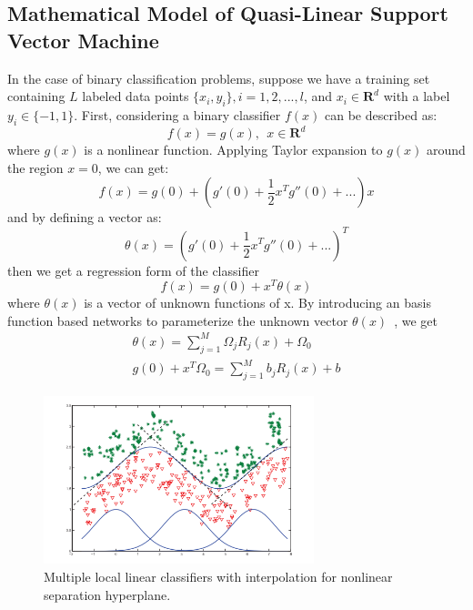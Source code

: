 \documentclass[master]{IPSstyle}
\begin{document}
{\subsection{Mathematical Model of Quasi-Linear Support Vector Machine}
In the case of binary classification problems, suppose we have a training set containing $L$ labeled data points $\{x_i, y_i\}, i=1,2,...,l$, and $x_i\in\mathbf{R}^d$ with a label $y_i \in \{-1,1\}$. First, considering a binary classifier $f(x)$ can be described as:
\begin{equation}
f(x) = g(x), ~~ x\in \mathbf{R}^d \label{eq:2.18}
\end{equation}
where $g(x)$ is a nonlinear function. Applying Taylor expansion to $g(x)$ around the region $x=0$, we can get:
\begin{equation}
f(x) = g(0) + \left(g'(0) + \frac{1}{2}x^Tg''(0)+...\right)x \label{eq:2.19}
\end{equation}
and by defining a vector as:
\begin{equation}
\theta(x) = \left(g'(0) + \frac{1}{2}x^Tg''(0) + ...\right)^T \label{eq:20}
\end{equation}
then we get a regression form of the classifier
\begin{equation}\label{eq:2.21}
f(x)=g(0)+x^T\theta(x)
\end{equation}
where $\theta(x)$ is a vector of unknown functions of x. By introducing an basis function based networks to parameterize the unknown vector $\theta(x)$~\cite{moody1989fast}, we get
\begin{align}
\theta(x)=\sum_{j=1}^{M}\Omega_jR_j(x)+\Omega_0 \label{eq:2.22}\\
g(0)+x^T\Omega_0 = \sum_{j=1}^{M}b_jR_j(x)+b \label{eq:2.23}
\end{align}
\begin{figure}[H]
  \centering
  \includegraphics[width=0.7\textwidth]{figures/ch2_visual_QLSVM.png}
  \caption{Multiple local linear classifiers with interpolation for nonlinear separation hyperplane.} \label{fg:visual_QLSVM}

\end{figure}}
\end{document}
